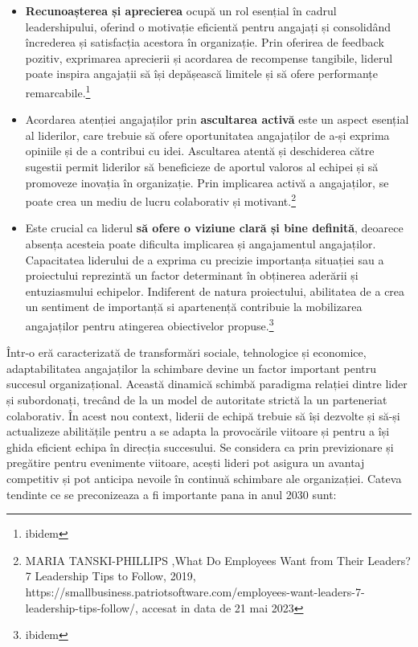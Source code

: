 \documentclass[a4paper, 12pt]{article}
\begin{document}
\begin{itemize}
	\item\textbf{Recunoașterea și aprecierea} ocupă un rol esențial în cadrul leadershipului, oferind o motivație eficientă pentru angajați și consolidând încrederea și satisfacția acestora în organizație. Prin oferirea de feedback pozitiv, exprimarea aprecierii și acordarea de recompense tangibile, liderul poate inspira angajații să își depășească limitele și să ofere performanțe remarcabile.\footnote{ibidem}

		\item Acordarea atenției angajaților prin \textbf {ascultarea activă} este un aspect esențial al liderilor, care trebuie să ofere oportunitatea angajaților de a-și exprima opiniile și de a contribui cu idei. Ascultarea atentă și deschiderea către sugestii permit liderilor să beneficieze de aportul valoros al echipei și să promoveze inovația în organizație. Prin implicarea activă a angajaților, se poate crea un mediu de lucru colaborativ și motivant.\footnote{MARIA TANSKI-PHILLIPS ,What Do Employees Want from Their Leaders? 7 Leadership Tips to Follow, 2019, https://smallbusiness.patriotsoftware.com/employees-want-leaders-7-leadership-tips-follow/, accesat in data de 21 mai 2023}
	

	\item Este crucial ca liderul \textbf{ să ofere o viziune clară și bine definită}, deoarece absența acesteia poate dificulta implicarea și angajamentul angajaților. Capacitatea liderului de a exprima cu precizie importanța situației sau a proiectului reprezintă un factor determinant în obținerea aderării și entuziasmului echipelor. Indiferent de natura proiectului, abilitatea de a crea un sentiment de importanță si apartenență contribuie la mobilizarea angajaților pentru atingerea obiectivelor propuse.\footnote{ibidem}

	\end{itemize}

	\quad\quad Într-o eră caracterizată de transformări sociale, tehnologice și economice, adaptabilitatea angajaților la schimbare devine un factor important pentru succesul organizațional. Această dinamică schimbă paradigma relației dintre lider și subordonați, trecând de la un model de autoritate strictă la un parteneriat colaborativ. În acest nou context, liderii de echipă trebuie să își dezvolte și să-și actualizeze abilitățile pentru a se adapta la provocările viitoare și pentru a își ghida eficient echipa în direcția succesului. Se considera ca prin previzionare și pregătire pentru evenimente viitoare, acești lideri pot asigura un avantaj competitiv și pot anticipa nevoile în continuă schimbare ale organizației. Cateva tendinte ce se preconizeaza a fi importante pana in anul 2030 sunt:
\end{document}
